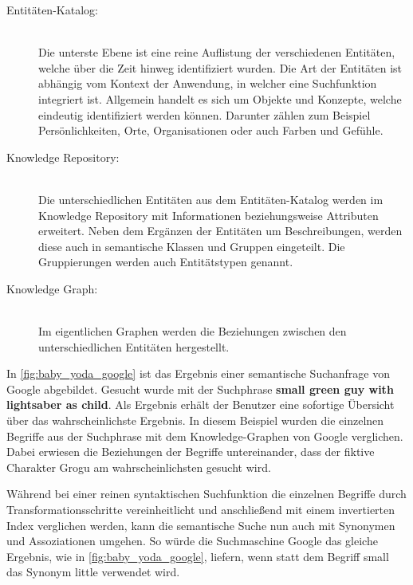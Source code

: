\begin{description}
    \item[Entitäten-Katalog:]\hfill \\
    Die unterste Ebene ist eine reine Auflistung der verschiedenen Entitäten, welche über die Zeit hinweg identifiziert wurden. Die Art der Entitäten ist abhängig vom Kontext der Anwendung, in welcher eine Suchfunktion integriert ist. Allgemein handelt es sich um Objekte und Konzepte, welche eindeutig identifiziert werden können. Darunter zählen zum Beispiel Persönlichkeiten, Orte, Organisationen oder auch Farben und Gefühle.
    \item[Knowledge Repository:]\hfill \\
    Die unterschiedlichen Entitäten aus dem Entitäten-Katalog werden im Knowledge Repository mit Informationen beziehungsweise Attributen erweitert. Neben dem Ergänzen der Entitäten um Beschreibungen, werden diese auch in semantische Klassen und Gruppen eingeteilt. Die Gruppierungen werden auch Entitätstypen genannt.
    \item[Knowledge Graph:]\hfill \\
    Im eigentlichen Graphen werden die Beziehungen zwischen den unterschiedlichen Entitäten hergestellt.
\end{description}

In \autoref{fig:baby_yoda_google} ist das Ergebnis einer semantische Suchanfrage von Google abgebildet. Gesucht wurde mit der Suchphrase \glqq \textbf{small green guy with lightsaber as child}\grqq{}. Als Ergebnis erhält der Benutzer eine sofortige Übersicht über das wahrscheinlichste Ergebnis. In diesem Beispiel wurden die einzelnen Begriffe aus der Suchphrase mit dem Knowledge-Graphen von Google verglichen. Dabei erwiesen die Beziehungen der Begriffe untereinander, dass der fiktive Charakter \glqq Grogu\grqq{} am wahrscheinlichsten gesucht wird. 

Während bei einer reinen syntaktischen Suchfunktion die einzelnen Begriffe durch Transformationsschritte vereinheitlicht und anschließend mit einem invertierten Index verglichen werden, kann die semantische Suche nun auch mit Synonymen und Assoziationen umgehen. So würde die Suchmaschine Google das gleiche Ergebnis, wie in \autoref{fig:baby_yoda_google}, liefern, wenn statt dem Begriff \glqq small\grqq{} das Synonym \glqq little\grqq{} verwendet wird.

